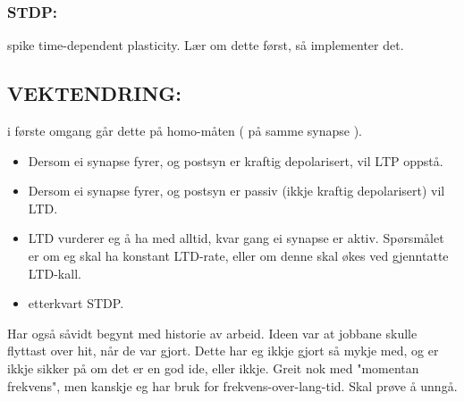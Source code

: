 \documentclass[norsk,11 pt]{report}
\begin{document}
		\subsubsection{STDP:}
		spike time-dependent plasticity. Lær om dette først, så implementer det.

	\subsection{VEKTENDRING:}
		i første omgang går dette på homo-måten ( på samme synapse ). 
		\begin{itemize}
			\item Dersom ei synapse fyrer, og postsyn er kraftig depolarisert, vil LTP oppstå.
			\item Dersom ei synapse fyrer, og postsyn er passiv (ikkje kraftig depolarisert) vil LTD.
			\item LTD vurderer eg å ha med alltid, kvar gang ei synapse er aktiv. Spørsmålet er om eg skal ha konstant LTD-rate, eller om denne skal
			økes ved gjenntatte LTD-kall.

			\item etterkvart STDP.
		\end{itemize}



Har også såvidt begynt med historie av arbeid. Ideen var at jobbane skulle flyttast over hit, når de var gjort. Dette har eg ikkje gjort så mykje med, og er 
ikkje sikker på om det er en god ide, eller ikkje. Greit nok med "momentan frekvens", men kanskje eg har bruk for frekvens-over-lang-tid. Skal prøve å unngå.












\end{document}
